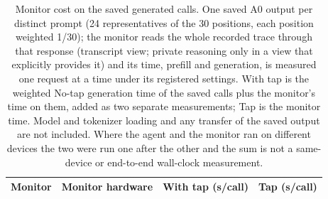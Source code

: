 \begin{table}[t]
\centering\footnotesize
\begin{tabular}{llcc}
\toprule
Monitor & Monitor hardware & With tap (s/call) & Tap (s/call) \\
\midrule
\bottomrule
\end{tabular}
\caption{Monitor cost on the saved generated calls. One saved A0 output per distinct prompt (24 representatives of the 30 positions, each position weighted 1/30); the monitor reads the whole recorded trace through that response (transcript view; private reasoning only in a view that explicitly provides it) and its time, prefill and generation, is measured one request at a time under its registered settings. With tap is the weighted No-tap generation time of the saved calls plus the monitor's time on them, added as two separate measurements; Tap is the monitor time. Model and tokenizer loading and any transfer of the saved output are not included. Where the agent and the monitor ran on different devices the two were run one after the other and the sum is not a same-device or end-to-end wall-clock measurement.}
\end{table}
